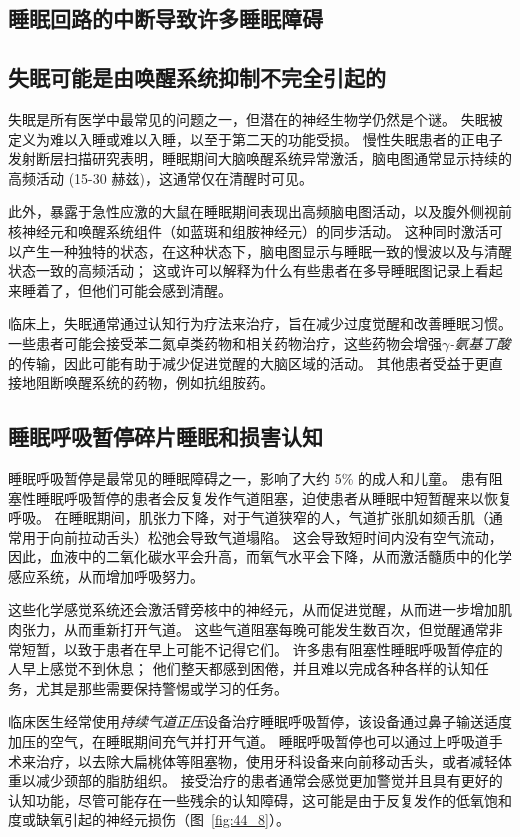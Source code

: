\subsection{睡眠回路的中断导致许多睡眠障碍}

\subsection{失眠可能是由唤醒系统抑制不完全引起的}

失眠是所有医学中最常见的问题之一，但潜在的神经生物学仍然是个谜。
失眠被定义为难以入睡或难以入睡，以至于第二天的功能受损。
慢性失眠患者的正电子发射断层扫描研究表明，睡眠期间大脑唤醒系统异常激活，脑电图通常显示持续的高频活动 (15-30 赫兹)，这通常仅在清醒时可见。


此外，暴露于急性应激的大鼠在睡眠期间表现出高频脑电图活动，以及腹外侧视前核神经元和唤醒系统组件（如蓝斑和组胺神经元）的同步活动。
这种同时激活可以产生一种独特的状态，在这种状态下，脑电图显示与睡眠一致的慢波以及与清醒状态一致的高频活动；
这或许可以解释为什么有些患者在多导睡眠图记录上看起来睡着了，但他们可能会感到清醒。


临床上，失眠通常通过认知行为疗法来治疗，旨在减少过度觉醒和改善睡眠习惯。
一些患者可能会接受苯二氮卓类药物和相关药物治疗，这些药物会增强\textit{$\gamma$-氨基丁酸}的传输，因此可能有助于减少促进觉醒的大脑区域的活动。
其他患者受益于更直接地阻断唤醒系统的药物，例如抗组胺药。



\subsection{睡眠呼吸暂停碎片睡眠和损害认知}

睡眠呼吸暂停是最常见的睡眠障碍之一，影响了大约 5\% 的成人和儿童。
患有阻塞性睡眠呼吸暂停的患者会反复发作气道阻塞，迫使患者从睡眠中短暂醒来以恢复呼吸。
在睡眠期间，肌张力下降，对于气道狭窄的人，气道扩张肌如颏舌肌（通常用于向前拉动舌头）松弛会导致气道塌陷。
这会导致短时间内没有空气流动，因此，血液中的二氧化碳水平会升高，而氧气水平会下降，从而激活髓质中的化学感应系统，从而增加呼吸努力。


这些化学感觉系统还会激活臂旁核中的神经元，从而促进觉醒，从而进一步增加肌肉张力，从而重新打开气道。
这些气道阻塞每晚可能发生数百次，但觉醒通常非常短暂，以致于患者在早上可能不记得它们。
许多患有阻塞性睡眠呼吸暂停症的人早上感觉不到休息；
他们整天都感到困倦，并且难以完成各种各样的认知任务，尤其是那些需要保持警惕或学习的任务。


临床医生经常使用\textit{持续气道正压}设备治疗睡眠呼吸暂停，该设备通过鼻子输送适度加压的空气，在睡眠期间充气并打开气道。
睡眠呼吸暂停也可以通过上呼吸道手术来治疗，以去除大扁桃体等阻塞物，使用牙科设备来向前移动舌头，或者减轻体重以减少颈部的脂肪组织。
接受治疗的患者通常会感觉更加警觉并且具有更好的认知功能，尽管可能存在一些残余的认知障碍，这可能是由于反复发作的低氧饱和度或缺氧引起的神经元损伤（图~\ref{fig:44_8}）。


